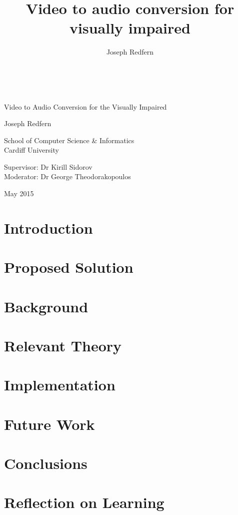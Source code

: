 \documentclass[12pt,a4paper,oneside]{memoir}
\author{Joseph Redfern}
\title{Video to audio conversion for visually impaired}
\date{}
\begin{document}
\frontmatter
\thispagestyle{empty}

{%
\sffamily
\centering
\Large

~\vspace{\fill}

{\huge 
    Video to Audio Conversion for the Visually Impaired
}

\vspace{2.5cm}

{\LARGE
    Joseph Redfern
}

\vspace{3.5cm}

School of Computer Science \& Informatics\\
Cardiff University

\vspace{3.5cm}

Supervisor: Dr Kirill Sidorov \\
Moderator: Dr George Theodorakopoulos

\vspace{\fill}

May 2015

}

\newpage
\thispagestyle{empty}


\newpage



\newpage

\tableofcontents*

\clearpage

\listoffigures
\mainmatter
\chapter{Introduction}

\chapter{Proposed Solution}

\chapter{Background}

\chapter{Relevant Theory}

\chapter{Implementation}

\chapter{Future Work}

\chapter{Conclusions}

\chapter{Reflection on Learning}

\newpage


\newpage
\printbibliography
\end{document}
